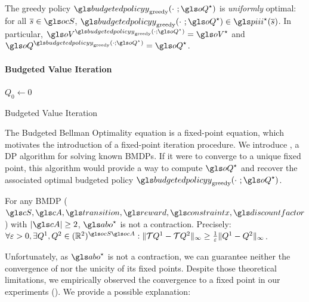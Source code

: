 \begin{proposition}
	\begin{leftbar}[propositionbar]
	\label{prop:greedy_optimal}
	The greedy policy $\budgetedpolicy_\text{greedy}(\cdot~; \oQ^{\star})$ is \emph{uniformly} optimal: for all $\os\in\ocS$, $\budgetedpolicy_\text{greedy}(\cdot~; \oQ^{\star})\in\policies^{\star}(\os)$. In particular, $\oV^{\budgetedpolicy_\text{greedy}(\cdot; \oQ^{\star})} = \oV^{\star}$ and $\oQ^{\budgetedpolicy_\text{greedy}(\cdot; \oQ^{\star})}= \oQ^{\star}$.
	\end{leftbar}
\end{proposition}

\paragraph{Budgeted Value Iteration}


\begin{algorithm}
	\DontPrintSemicolon
	$Q_{0} \leftarrow 0$\;
	\caption{Budgeted Value Iteration}
	\label{algo:bvi}
\end{algorithm}

The Budgeted Bellman Optimality equation is a fixed-point equation, which motivates the introduction of a fixed-point iteration procedure. We introduce , a \acrlong{DP} algorithm for solving known \glspl{BMDP}. If it were to converge to a unique fixed point, this algorithm would provide a way to compute $\oQ^{\star}$ and recover the associated optimal budgeted policy $\budgetedpolicy_\text{greedy}(\cdot~; \oQ^{\star})$.

\begin{theorem}
	\begin{leftbar}[theorembar]
	\label{thm:contraction}
	For any \gls{BMDP} ($\cS,\cA,\Ps,\R,\constraint,\discountfactor$) with $|\cA| \geq 2$, $\abo^{\star}$ is not a contraction. Precisely: $\forall\epsilon>0, \exists Q^1,Q^2\in(\Real^2)^{\ocS\ocA}:\|\cT Q^1-\cT Q^2\|_\infty \geq \frac{1}{\epsilon}\|Q^1-Q^2\|_\infty$.
	\end{leftbar}
\end{theorem}

Unfortunately, as $\abo^{\star}$ is not a contraction, we can guarantee neither the convergence of  nor the unicity of its fixed points. Despite those theoretical limitations, we empirically observed the convergence to a fixed point in our experiments (). We provide a possible explanation:

